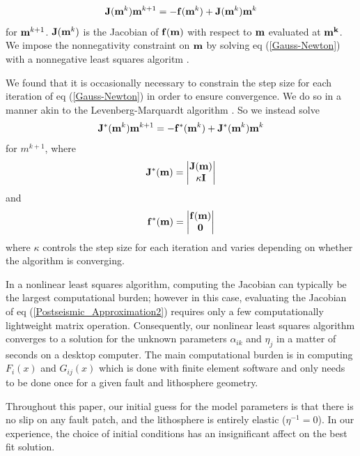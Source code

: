 \documentclass[12pt]{article}
\begin{document}
\begin{equation}\label{Gauss-Newton}
\bold{J}(\bold{m}^{k})\bold{m}^{k+1} = -\bold{f}(\bold{m}^k) + \bold{J}(\bold{m}^{k})\bold{m}^{k}
\end{equation}
for $\bold{m}^{k+1}$.  $\bold{J}(\bold{m}^k)$ is the Jacobian of
$\bold{f(m)}$ with respect to $\bold{m}$ evaluated at $\bold{m^k}$. We
impose the nonnegativity constraint on $\bold{m}$ by solving eq
(\ref{Gauss-Newton}) with a nonnegative least squares algoritm
\cite{LH1974}.

We found that it is occasionally necessary to constrain the step size
for each iteration of eq (\ref{Gauss-Newton}) in order to ensure
convergence.  We do so in a manner akin to the Levenberg-Marquardt
algorithm \citep{A2013}.  So we instead solve
\begin{equation}\label{Levenberg-Marquardt}
  \bold{J^*}(\bold{m}^k)\bold{m}^{k+1} = -\bold{f^*}(\bold{m}^k) + \bold{J^*}(\bold{m}^k)\bold{m}^k
\end{equation}
for $m^{k+1}$, where
\begin{equation}
  \bold{J^*}(\bold{m}) = 
      \begin{vmatrix}
      \bold{J}(\bold{m})\\
      \kappa\bold{I}
      \end{vmatrix}
\end{equation}
and
\begin{equation}
  \bold{f^*}(\bold{m}) = 
      \begin{vmatrix}
      \bold{f}(\bold{m})\\
      \bold{0}
      \end{vmatrix}
\end{equation}
where $\kappa$ controls the step size for each iteration and varies
depending on whether the algorithm is converging.  

In a nonlinear least squares algorithm, computing the Jacobian can
typically be the largest computational burden; however in this case,
evaluating the Jacobian of eq (\ref{Postseismic_Approximation2})
requires only a few computationally lightweight matrix operation.
Consequently, our nonlinear least squares algorithm converges to a
solution for the unknown parameters $\alpha_{ik}$ and $\eta_j$ in a
matter of seconds on a desktop computer.  The main computational
burden is in computing $F_i(x)$ and $G_{ij}(x)$
which is done with finite element software and only needs to be done
once for a given fault and lithosphere geometry.

Throughout this paper, our initial guess for the model parameters is
that there is no slip on any fault patch, and the lithosphere is
entirely elastic ($\eta^{-1} = 0$).  In our experience, the choice of
initial conditions has an insignificant affect on the best fit
solution.
\end{document}
